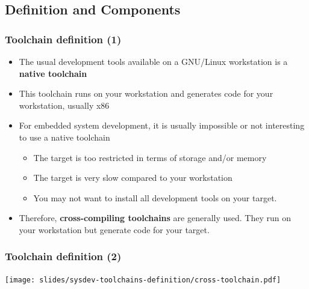 \subsection{Definition and Components}

\begin{frame}
  \frametitle{Toolchain definition (1)}
  \begin{itemize}
  \item The usual development tools available on a GNU/Linux
    workstation is a {\bf native toolchain}
  \item This toolchain runs on your workstation and generates code for
    your workstation, usually x86
  \item For embedded system development, it is usually impossible or not
    interesting to use a native toolchain
    \begin{itemize}
    \item The target is too restricted in terms of storage and/or memory
    \item The target is very slow compared to your workstation
    \item You may not want to install all development tools on your target.
    \end{itemize}
  \item Therefore, {\bf cross-compiling toolchains} are generally
    used. They run on your workstation but generate code for your
    target.
  \end{itemize}
\end{frame}

\begin{frame}
  \frametitle{Toolchain definition (2)}
  \begin{center}
    \texttt{[image: slides/sysdev-toolchains-definition/cross-toolchain.pdf]}
  \end{center}
\end{frame}

